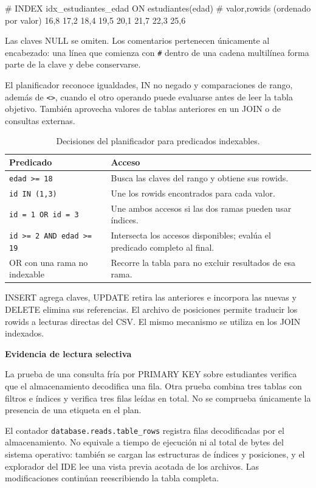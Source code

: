 \documentclass[11pt,a4paper]{article}
\newcommand{\subhead}[1]{\par\medskip\noindent\textbf{#1}\par\nopagebreak\smallskip}
\begin{document}
\begin{archivo}
# INDEX idx_estudiantes_edad ON estudiantes(edad)
# valor,rowids (ordenado por valor)
16,8
17,2
18,4
19,5
20,1
21,7
22,3
25,6
\end{archivo}

Las claves NULL se omiten. Los comentarios pertenecen únicamente al
encabezado: una línea que comienza con \texttt{\#} dentro de una cadena
multilínea forma parte de la clave y debe conservarse.

El planificador reconoce igualdades, IN no negado y comparaciones de rango,
además de \texttt{<>}, cuando el otro operando puede evaluarse antes de
leer la tabla objetivo. También aprovecha valores de tablas anteriores
en un JOIN o de consultas externas.

\begin{table}[H]\centering\small
\begin{tabularx}{\textwidth}{@{}L{4.0cm}Y@{}}
\toprule\textbf{Predicado} & \textbf{Acceso}\\\midrule
\texttt{edad >= 18} & Busca las claves del rango y obtiene sus rowids.\\
\texttt{id IN (1,3)} & Une los rowids encontrados para cada valor.\\
\texttt{id = 1 OR id = 3} & Une ambos accesos si las dos ramas pueden usar índices.\\
\texttt{id >= 2 AND edad >= 19} & Intersecta los accesos disponibles; evalúa el predicado completo al final.\\
OR con una rama no indexable & Recorre la tabla para no excluir resultados de esa rama.\\
\bottomrule
\end{tabularx}
\caption{Decisiones del planificador para predicados indexables.}
\end{table}

INSERT agrega claves, UPDATE retira las anteriores e incorpora las nuevas
y DELETE elimina sus referencias. El archivo de posiciones permite
traducir los rowids a lecturas directas del CSV. El mismo mecanismo se
utiliza en los JOIN indexados.

\subhead{Evidencia de lectura selectiva}
La prueba de una consulta fría por PRIMARY KEY sobre estudiantes verifica
que el almacenamiento decodifica una fila. Otra prueba combina tres
tablas con filtros e índices y verifica tres filas leídas en total.
No se comprueba únicamente la presencia de una etiqueta en el plan.

El contador \texttt{database.reads.table\_rows} registra filas decodificadas
por el almacenamiento. No equivale a tiempo de ejecución ni al total de
bytes del sistema operativo: también se cargan las estructuras de índices
y posiciones, y el explorador del IDE lee una vista previa acotada de
los archivos. Las modificaciones continúan reescribiendo la tabla completa.
\end{document}
